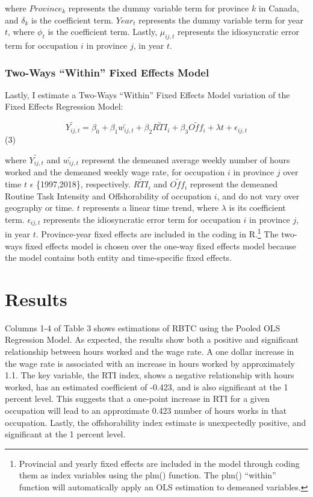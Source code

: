 \documentclass[undefended]{bumrp}
\begin{document}
where $Province_{k}$ represents the dummy variable term for province $k$ in Canada,  and $\delta_k$ is the coefficient term.  $Year_{t}$ represents the dummy variable term for year $t$, where $\phi_{t}$ is the coefficient term.  Lastly,  $\mu_{ij,t}$ represents the idiosyncratic error term for occupation $i$ in province $j$, in year $t$.

\subsection{Two-Ways “Within” Fixed Effects Model}

Lastly,  I estimate a Two-Ways “Within” Fixed Effects Model variation of the Fixed Effects Regression Model:

\begin{center}
$$ \tilde{Y_{ij,t}} = \beta_{0} + \beta_{1} \tilde{w_{ij,t}} + \beta_{2} \tilde{RTI_{i}} + \beta_{3} \tilde{Off_{i}} + \lambda t + \epsilon_{ij,t} $$ 	(3)
\end{center}

where $\tilde{Y_{ij,t}}$ and $\tilde{w_{ij,t}}$ represent the demeaned average weekly number of hours worked and the demeaned weekly wage rate, for occupation $i$ in province $j$ over time $t$ $\epsilon$ \{1997,2018\}, respectively.  $\tilde{RTI_{i}}$  and $\tilde{Off_{i}}$ represent the demeaned Routine Task Intensity and Offshorability of occupation $i$, and do not vary over geography or time.  $t$ represents a linear time trend, where $\lambda$ is its coefficient term. $\epsilon_{ij,t}$ represents the idiosyncratic error term for occupation $i$ in province $j$,  in year $t$.  Province-year fixed effects are included in the coding in R.\footnote{Provincial and yearly fixed effects are included in the model through coding them as index variables using the plm() function. The plm() “within” function will automatically apply an OLS estimation to demeaned variables.} The two-ways fixed effects model is chosen over the one-way fixed effects model because the model contains both entity and time-specific fixed effects. 

\chapter{Results}

Columns 1-4 of Table 3 shows estimations of RBTC using the Pooled OLS Regression Model. As expected, the results show both a positive and significant relationship between hours worked and the wage rate. A one dollar increase in the wage rate is associated with an increase in hours worked by approximately 1.1. The key variable, the RTI index, shows a negative relationship with hours worked, has an estimated coefficient of -0.423, and is also significant at the 1 percent level. This suggests that a one-point increase in RTI for a given occupation will lead to an approximate 0.423 number of hours works in that occupation. Lastly, the offshorability index estimate is unexpectedly positive, and significant at the 1 percent level.
\end{document}
